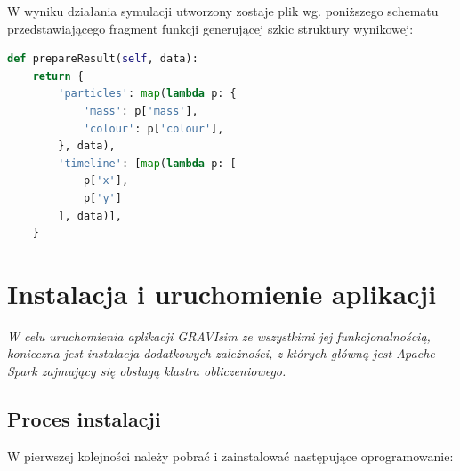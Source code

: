 \documentclass[a4paper,onecolumn,oneside,12pt]{memoir}
\renewenvironment{quote}{
	\begin{list}{}
	{
	\setlength{\leftmargin}{1em}
	\setlength{\topsep}{0pt}%
	\setlength{\partopsep}{0pt}%
	\setlength{\parskip}{0pt}%
	\setlength{\parsep}{0pt}%
	\setlength{\itemsep}{0pt}
	}
	}{
	\end{list}}
\begin{document}
{W wyniku działania symulacji utworzony zostaje plik wg. poniższego schematu przedstawiającego
fragment funkcji generującej szkic struktury wynikowej:

\begin{lstlisting}[language=Python, caption=Wynik symulacji]
def prepareResult(self, data):
	return {
		'particles': map(lambda p: {
			'mass': p['mass'],
			'colour': p['colour'],
		}, data),
		'timeline': [map(lambda p: [
			p['x'],
			p['y']
		], data)],
	}
\end{lstlisting}


\chapter{Instalacja i uruchomienie aplikacji}
{\emph{\quad \quad W celu uruchomienia aplikacji GRAVIsim ze wszystkimi jej funkcjonalnością, konieczna jest instalacja dodatkowych zależności, z których główną jest \textit{Apache Spark} zajmujący się obsługą klastra obliczeniowego.}
\section{Proces instalacji}
W pierwszej kolejności należy pobrać i zainstalować następujące oprogramowanie:


}}
\end{document}
